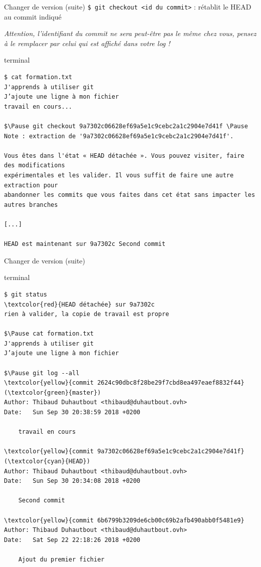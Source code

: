 \documentclass[usepdftitle=false]{beamer}
\def\seplength{.3\topsep}
\newcommand{\Pause}{%
\ifdef{\Release}
  {\pause}
  {}
}
\begin{document}
\begin{frame}[fragile]{Changer de version (suite)}
	\verb+$ git checkout <id du commit>+ : rétablit le HEAD au commit indiqué

	\vfill

	\emph{Attention, l'identifiant du commit ne sera peut-être pas le même chez vous, pensez à le remplacer par celui qui est affiché dans votre log !}

	\vfill

	\begin{beamercolorbox}[rounded=true,shadow=true]{terminal}
\vspace{-\seplength}
\begin{Verbatim}
$ cat formation.txt
J'apprends à utiliser git
J’ajoute une ligne à mon fichier
travail en cours...

$\Pause git checkout 9a7302c06628ef69a5e1c9cebc2a1c2904e7d41f \Pause
Note : extraction de '9a7302c06628ef69a5e1c9cebc2a1c2904e7d41f'.

Vous êtes dans l'état « HEAD détachée ». Vous pouvez visiter, faire des modifications
expérimentales et les valider. Il vous suffit de faire une autre extraction pour
abandonner les commits que vous faites dans cet état sans impacter les autres branches

[...]

HEAD est maintenant sur 9a7302c Second commit
\end{Verbatim}
	\end{beamercolorbox}
\end{frame}

\begin{frame}[fragile]{Changer de version (suite)}
	\begin{beamercolorbox}[rounded=true,shadow=true]{terminal}
		\vspace{-\seplength}
\begin{Verbatim}
$ git status
\textcolor{red}{HEAD détachée} sur 9a7302c
rien à valider, la copie de travail est propre

$\Pause cat formation.txt
J'apprends à utiliser git
J’ajoute une ligne à mon fichier

$\Pause git log --all
\textcolor{yellow}{commit 2624c90dbc8f28be29f7cbd8ea497eaef8832f44} (\textcolor{green}{master})
Author: Thibaud Duhautbout <thibaud@duhautbout.ovh>
Date:   Sun Sep 30 20:38:59 2018 +0200

    travail en cours

\textcolor{yellow}{commit 9a7302c06628ef69a5e1c9cebc2a1c2904e7d41f} (\textcolor{cyan}{HEAD})
Author: Thibaud Duhautbout <thibaud@duhautbout.ovh>
Date:   Sun Sep 30 20:34:08 2018 +0200

    Second commit

\textcolor{yellow}{commit 6b6799b3209de6cb00c69b2afb490abb0f5481e9}
Author: Thibaud Duhautbout <thibaud@duhautbout.ovh>
Date:   Sat Sep 22 22:18:26 2018 +0200

    Ajout du premier fichier
\end{Verbatim}
	\end{beamercolorbox}
\end{frame}
\end{document}
